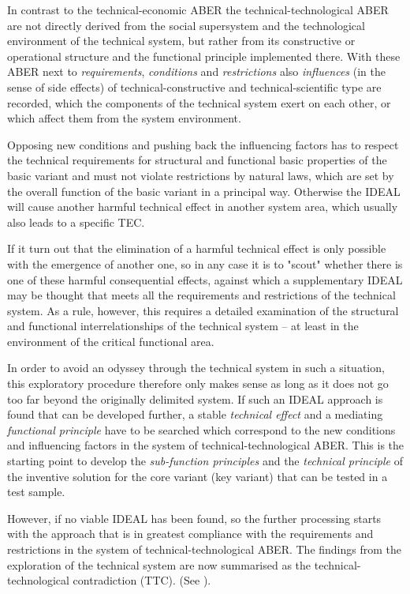 \documentclass[11pt,a4paper]{article}
\begin{document}
In contrast to the technical-economic ABER the technical-technological ABER
are not directly derived from the social supersystem and the technological
environment of the technical system, but rather from its constructive or
operational structure and the functional principle implemented there.  With
these ABER next to \emph{requirements}, \emph{conditions} and
\emph{restrictions} also \emph{influences} (in the sense of side effects) of
technical-constructive and technical-scientific type are recorded, which the
components of the technical system exert on each other, or which affect them
from the system environment.

Opposing new conditions and pushing back the influencing factors has to
respect the technical requirements for structural and functional basic
properties of the basic variant and must not violate restrictions by natural
laws, which are set by the overall function of the basic variant in a
principal way.  Otherwise the IDEAL will cause another harmful technical
effect in another system area, which usually also leads to a specific TEC.

If it turn out that the elimination of a harmful technical effect is only
possible with the emergence of another one, so in any case it is to "scout"
whether there is one of these harmful consequential effects, against which a
supplementary IDEAL may be thought that meets all the requirements and
restrictions of the technical system.  As a rule, however, this requires a
detailed examination of the structural and functional interrelationships of
the technical system -- at least in the environment of the critical functional
area.

In order to avoid an odyssey through the technical system in such a situation,
this exploratory procedure therefore only makes sense as long as it does not
go too far beyond the originally delimited system.  If such an IDEAL approach
is found that can be developed further, a stable \emph{technical effect} and a
mediating \emph{functional principle} have to be searched which correspond to
the new conditions and influencing factors in the system of
technical-technological ABER.  This is the starting point to develop the
\emph{sub-function principles} and the \emph{technical principle} of the
inventive solution for the core variant (key variant) that can be tested in a
test sample.

However, if no viable IDEAL has been found, so the further processing starts
with the approach that is in greatest compliance with the requirements and
restrictions in the system of technical-technological ABER. The findings from
the exploration of the technical system are now summarised as the
technical-technological contradiction (TTC). (See \cite[A.7]{RM-21}).
\end{document}
